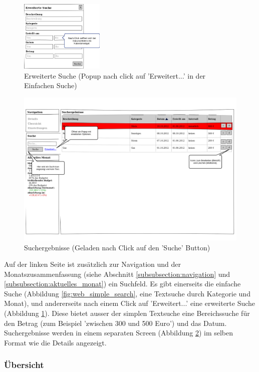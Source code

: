 \begin{figure}[htl]
\centering
\includegraphics[width=4cm]{img/web_advanced_search}
\caption{Erweiterte Suche (Popup nach click auf 'Erweitert...' in der Einfachen Suche)}
\label{fig:web_advanced_search}
\end{figure}

\begin{figure}[htl]
\centering
\includegraphics[width=\textwidth]{img/web_search}
\caption{Suchergebnisse (Geladen nach Click auf den 'Suche' Button)}
\label{fig:web_search}
\end{figure}

Auf der linken Seite ist zusätzlich zur Navigation und der Monatszusammenfassung (siehe Abschnitt \ref{subsubsection:navigation} und \ref{subsubsection:aktuelles_monat}) ein Suchfeld. Es gibt einerseits die einfache Suche (Abbildung \ref{fig:web_simple_search}, eine Textsuche durch Kategorie und Monat), und andererseits nach einem Click auf 
'Erweitert...' eine erweiterte Suche (Abbildung \ref{fig:web_advanced_search}). Diese bietet ausser der simplen Textsuche eine Bereichssuche für den Betrag (zum Beispiel 'zwischen 300 und 500 Euro') und das Datum. Suchergebnisse werden in einem separaten Screen (Abbildung \ref{fig:web_search}) im selben Format wie die Details angezeigt.

\subsubsection{Übersicht}

